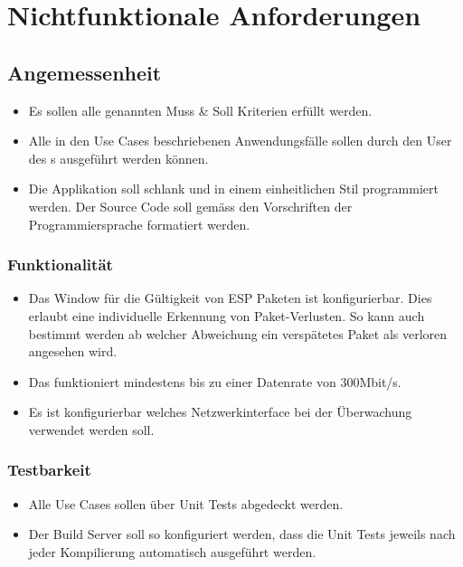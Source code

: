 \section{Nichtfunktionale Anforderungen}
\label{sec:Nichtfunktionale Anforderungen}

\subsection{Angemessenheit}
\begin{itemize}
\item Es sollen alle genannten Muss \& Soll Kriterien erfüllt werden.
\item Alle in den Use Cases beschriebenen Anwendungsfälle sollen durch den User des \tool{}s ausgeführt werden können.
\item Die Applikation soll schlank und in einem einheitlichen Stil programmiert werden. Der Source Code soll gemäss den Vorschriften der Programmiersprache formatiert werden.
\end{itemize}

\subsubsection{Funktionalität}
\begin{itemize}
\item Das Window für die Gültigkeit von \ac{ESP} Paketen ist konfigurierbar. Dies erlaubt eine individuelle Erkennung von Paket-Verlusten. So kann auch bestimmt werden ab welcher Abweichung ein verspätetes Paket als verloren angesehen wird.
\item Das \tool{} funktioniert mindestens bis zu einer Datenrate von 300Mbit/s.
\item Es ist konfigurierbar welches Netzwerkinterface bei der Überwachung verwendet werden soll.
\end{itemize}

\subsubsection{Testbarkeit}
\begin{itemize}
\item Alle Use Cases sollen über Unit Tests abgedeckt werden.
\item Der Build Server soll so konfiguriert werden, dass die Unit Tests jeweils nach jeder Kompilierung automatisch ausgeführt werden.
\end{itemize}

